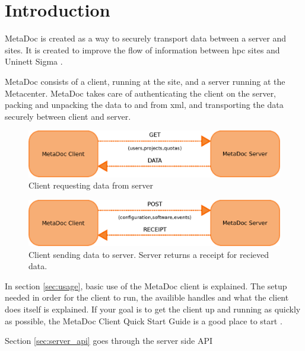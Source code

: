 \newpage
\section{Introduction}
MetaDoc is created as a way to securely transport data between a server and 
sites. It is created to improve the flow of information between \gls{hpc} sites
and Uninett Sigma \cite{improvingflow}.

MetaDoc consists of a client, running at the site, and a server running at the
Metacenter. MetaDoc takes care of authenticating the client on the server,
packing and unpacking the data to and from \gls{xml}, and transporting the data
securely between client and server. 

\begin{figure}[h!]
    \includegraphics[width=\textwidth]{img/get_data}
    \caption{Client requesting data from server}
    \label{fig:get_data}
\end{figure}

\begin{figure}[h!]
    \includegraphics[width=\textwidth]{img/post_data}
    \caption{Client sending data to server. Server returns a receipt for
    recieved data.}
    \label{fig:post_data}
\end{figure}

In section \ref{sec:usage}, basic use of the MetaDoc client is explained. The
setup needed in order for the client to run, the availible handles and what the
client does itself is explained. If your goal is to get the client up and
running as quickly as possible, the MetaDoc Client Quick Start Guide is a good
place to start \cite{quick_start_guide}.

Section \ref{sec:server_api} goes through the server side API

